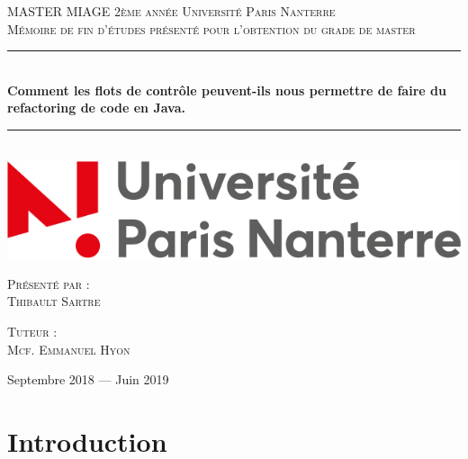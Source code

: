 \documentclass[a4paper,twoside,12pt,openright]{report}
\newcommand{\HRule}{\rule{\linewidth}{0.5mm}}
\begin{document}
\begin{titlepage}
  \begin{sffamily}
  \begin{center}

    \textsc{\LARGE MASTER MIAGE 2ème année \linebreak Université Paris Nanterre}\\[2cm]

    \textsc{\Large Mémoire de fin d’études présenté pour l’obtention du grade de master}\\[1.5cm]

    \HRule \\[0.4cm]
    { \huge \bfseries Comment les flots de contrôle peuvent-ils nous permettre de faire du refactoring de code en Java. \\[0.4cm] }

    \HRule \\[2cm]
    \includegraphics[scale=0.40]{image/univ.jpg}
    \hspace{2cm}
    
    \vfill
  \begin{minipage}{0.4\textwidth}
      \begin{flushleft} \large
        \textsc{Présenté par :}\\ \textsc{Thibault Sartre}\\
      \end{flushleft}
    \end{minipage}
    \begin{minipage}{0.4\textwidth}
      \begin{flushright} \large
        \textsc{Tuteur :}\\ \textsc{Mcf. Emmanuel Hyon}\\
      \end{flushright}
    \end{minipage}
    \vfill
    {\large Septembre 2018 — Juin 2019}
  \end{center}
  \end{sffamily}
\end{titlepage}
\renewcommand{\contentsname}{Sommaire}
\tableofcontents{}



\chapter{Introduction}
\end{document}
